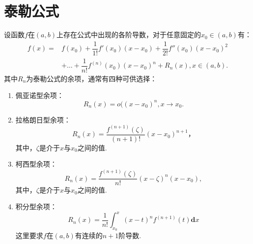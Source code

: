 \section{泰勒公式}

\begin{theorem}[泰勒公式]
	设函数$f$在$(a,b)$上存在公式中出现的各阶导数，对于任意固定的$x_0\in(a,b)$有：
	\begin{equation}
		\begin{split}
			f(x) = & f(x_0)+\dfrac{1}{1!}f'(x_0)(x-x_0)+\dfrac{1}{2!}f''(x_0)(x-x_0)^2 \\ & +\dots+\dfrac{1}{n!}f^{(n)}(x_0)(x-x_0)^n+R_n(x),x\in(a,b).
			\end{split}
	\end{equation}
	其中$R_n$为泰勒公式的余项，通常有四种可供选择：
	\begin{enumerate}
		\item 佩亚诺型余项：
		\begin{equation}
			R_n(x)=o((x-x_0)^n,x\rightarrow x_0.
		\end{equation}
		\item 拉格朗日型余项：
		\begin{equation}
			R_n(x)=\dfrac{f^{(n+1)}(\zeta)}{(n+1)!}(x-x_0)^{n+1}，
		\end{equation}
		其中，$\zeta$是介于$x$与$x_0$之间的值.
		\item 柯西型余项：
		\begin{equation}
			R_n(x)=\dfrac{f^{(n+1)}(\zeta)}{n!}(x-\zeta)^n(x-x_0),
		\end{equation}
		其中，$\zeta$是介于$x$与$x_0$之间的值.
		\item 积分型余项：
		\begin{equation}
			R_n(x)=\dfrac{1}{n!}\int_{x_0}^{x}(x-t)^nf^{(n+1)}(t)\textbf{d}x
		\end{equation}
		这里要求$f$在$(a,b)$有连续的$n+1$阶导数.
	\end{enumerate}
\end{theorem}